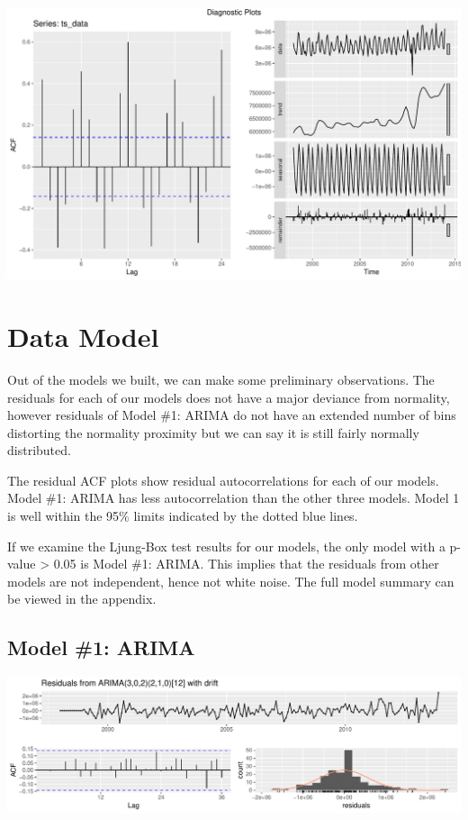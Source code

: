 \documentclass[openany]{book}
\begin{document}
\includegraphics{Part-B-AS_files/figure-latex/unnamed-chunk-3-1.pdf}

\section*{Data Model}\label{b-model}

Out of the models we built, we can make some preliminary observations.
The residuals for each of our models does not have a major deviance from
normality, however residuals of Model \#1: ARIMA do not have an extended
number of bins distorting the normality proximity but we can say it is
still fairly normally distributed.

The residual ACF plots show residual autocorrelations for each of our
models. Model \#1: ARIMA has less autocorrelation than the other three
models. Model 1 is well within the 95\% limits indicated by the dotted
blue lines.

If we examine the Ljung-Box test results for our models, the only model
with a p-value \textgreater{} 0.05 is Model \#1: ARIMA. This implies
that the residuals from other models are not independent, hence not
white noise. The full model summary can be viewed in the appendix.

\subsection{Model \#1: ARIMA}\label{model-1-arima}

\includegraphics{Part-B-AS_files/figure-latex/unnamed-chunk-4-1.pdf}
\end{document}
